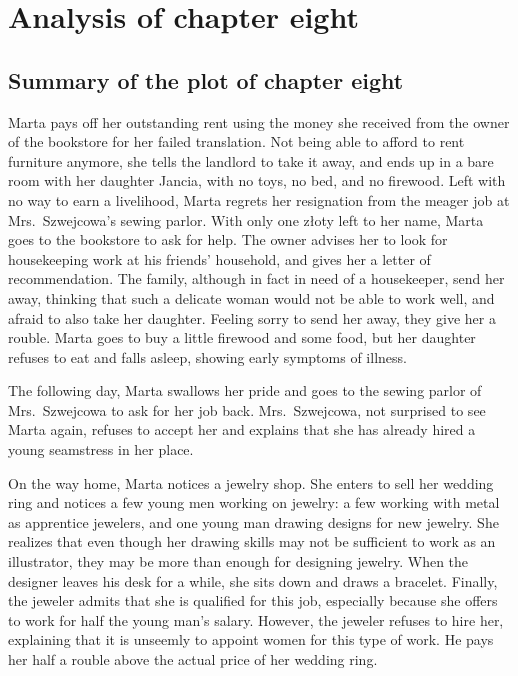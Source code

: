 \section{Analysis of chapter eight}

\subsection{Summary of the plot of chapter eight}

Marta pays off her outstanding rent using the money she received from the owner of the bookstore for her failed translation.
Not being able to afford to rent furniture anymore, she tells the landlord to take it away, and ends up in a bare room with her daughter Jancia, with no toys, no bed, and no firewood.
Left with no way to earn a livelihood, Marta regrets her resignation from the meager job at Mrs.\ Szwejcowa's sewing parlor.
With only one złoty left to her name, Marta goes to the bookstore to ask for help.
The owner advises her to look for housekeeping work at his friends' household, and gives her a letter of recommendation.
The family, although in fact in need of a housekeeper, send her away, thinking that such a delicate woman would not be able to work well, and afraid to also take her daughter.
Feeling sorry to send her away, they give her a rouble.
Marta goes to buy a little firewood and some food, but her daughter refuses to eat and falls asleep, showing early symptoms of illness.

The following day, Marta swallows her pride and goes to the sewing parlor of Mrs.\ Szwejcowa to ask for her job back.
Mrs.\ Szwejcowa, not surprised to see Marta again, refuses to accept her and explains that she has already hired a young seamstress in her place.

On the way home, Marta notices a jewelry shop.
She enters to sell her wedding ring and notices a few young men working on jewelry: a few working with metal as apprentice jewelers, and one young man drawing designs for new jewelry.
She realizes that even though her drawing skills may not be sufficient to work as an illustrator, they may be more than enough for designing jewelry.
When the designer leaves his desk for a while, she sits down and draws a bracelet.
Finally, the jeweler admits that she is qualified for this job, especially because she offers to work for half the young man's salary.
However, the jeweler refuses to hire her, explaining that it is unseemly to appoint women for this type of work.
He pays her half a rouble above the actual price of her wedding ring.

